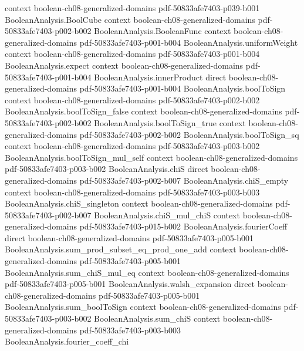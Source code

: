 \begin{lemma}
  {context}
  {boolean-ch08-generalized-domains}
  {pdf-50833afe7403-p039-b001}
\proofstep
  {BooleanAnalysis.BoolCube}
  {context}
  {boolean-ch08-generalized-domains}
  {pdf-50833afe7403-p002-b002}
\proofstep
  {BooleanAnalysis.BooleanFunc}
  {context}
  {boolean-ch08-generalized-domains}
  {pdf-50833afe7403-p001-b004}
\proofstep
  {BooleanAnalysis.uniformWeight}
  {context}
  {boolean-ch08-generalized-domains}
  {pdf-50833afe7403-p001-b004}
\proofstep
  {BooleanAnalysis.expect}
  {context}
  {boolean-ch08-generalized-domains}
  {pdf-50833afe7403-p001-b004}
\proofstep
  {BooleanAnalysis.innerProduct}
  {direct}
  {boolean-ch08-generalized-domains}
  {pdf-50833afe7403-p001-b004}
\proofstep
  {BooleanAnalysis.boolToSign}
  {context}
  {boolean-ch08-generalized-domains}
  {pdf-50833afe7403-p002-b002}
\proofstep
  {BooleanAnalysis.boolToSign_false}
  {context}
  {boolean-ch08-generalized-domains}
  {pdf-50833afe7403-p002-b002}
\proofstep
  {BooleanAnalysis.boolToSign_true}
  {context}
  {boolean-ch08-generalized-domains}
  {pdf-50833afe7403-p002-b002}
\proofstep
  {BooleanAnalysis.boolToSign_sq}
  {context}
  {boolean-ch08-generalized-domains}
  {pdf-50833afe7403-p003-b002}
\proofstep
  {BooleanAnalysis.boolToSign_mul_self}
  {context}
  {boolean-ch08-generalized-domains}
  {pdf-50833afe7403-p003-b002}
\proofstep
  {BooleanAnalysis.chiS}
  {direct}
  {boolean-ch08-generalized-domains}
  {pdf-50833afe7403-p002-b007}
\proofstep
  {BooleanAnalysis.chiS_empty}
  {context}
  {boolean-ch08-generalized-domains}
  {pdf-50833afe7403-p003-b003}
\proofstep
  {BooleanAnalysis.chiS_singleton}
  {context}
  {boolean-ch08-generalized-domains}
  {pdf-50833afe7403-p002-b007}
\proofstep
  {BooleanAnalysis.chiS_mul_chiS}
  {context}
  {boolean-ch08-generalized-domains}
  {pdf-50833afe7403-p015-b002}
\proofstep
  {BooleanAnalysis.fourierCoeff}
  {direct}
  {boolean-ch08-generalized-domains}
  {pdf-50833afe7403-p005-b001}
\proofstep
  {BooleanAnalysis.sum_prod_subset_eq_prod_one_add}
  {context}
  {boolean-ch08-generalized-domains}
  {pdf-50833afe7403-p005-b001}
\proofstep
  {BooleanAnalysis.sum_chiS_mul_eq}
  {context}
  {boolean-ch08-generalized-domains}
  {pdf-50833afe7403-p005-b001}
\proofstep
  {BooleanAnalysis.walsh_expansion}
  {direct}
  {boolean-ch08-generalized-domains}
  {pdf-50833afe7403-p005-b001}
\proofstep
  {BooleanAnalysis.sum_boolToSign}
  {context}
  {boolean-ch08-generalized-domains}
  {pdf-50833afe7403-p003-b002}
\proofstep
  {BooleanAnalysis.sum_chiS}
  {context}
  {boolean-ch08-generalized-domains}
  {pdf-50833afe7403-p003-b003}
\proofstep
  {BooleanAnalysis.fourier_coeff_chi}

\end{lemma}
